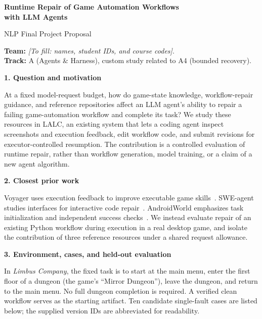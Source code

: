 \documentclass[10pt,a4paper]{article}
\newcommand{\topic}[1]{\par\medskip\textbf{#1}\par\smallskip}
\newcommand{\todo}[1]{\textit{[To fill: #1]}}
\begin{document}
\begin{center}
  {\Large\bfseries Runtime Repair of Game Automation Workflows\\with LLM Agents}\par
  \vspace{3pt}
  NLP Final Project Proposal
\end{center}
\textbf{Team:} \todo{names, student IDs, and course codes}.\\
\textbf{Track:} A (Agents \& Harness), custom study related to A4 (bounded recovery).

\topic{1. Question and motivation}
At a fixed model-request budget, how do game-state knowledge, workflow-repair
guidance, and reference repositories affect an LLM agent's ability to repair a
failing game-automation workflow and complete its task? We study these resources
in LALC, an existing system that lets a coding agent inspect screenshots and
execution feedback, edit workflow code, and submit revisions for executor-controlled
resumption. The contribution is a controlled evaluation of runtime repair, rather
than workflow generation, model training, or a claim of a new agent algorithm.

\topic{2. Closest prior work}
Voyager uses execution feedback to improve executable game skills~\cite{voyager}.
SWE-agent studies interfaces for interactive code repair~\cite{sweagent}.
AndroidWorld emphasizes task initialization and independent success
checks~\cite{androidworld}. We instead evaluate repair of an existing Python
workflow during execution in a real desktop game, and isolate the contribution
of three reference resources under a shared request allowance.

\topic{3. Environment, cases, and held-out evaluation}
In \emph{Limbus Company}, the fixed task is to start at the main menu, enter the
first floor of a dungeon (the game's ``Mirror Dungeon''), leave the dungeon, and
return to the main menu. No full dungeon completion is required. A verified clean
workflow serves as the starting artifact. Ten candidate single-fault cases are
listed below; the supplied version IDs are abbreviated for readability.
\end{document}
